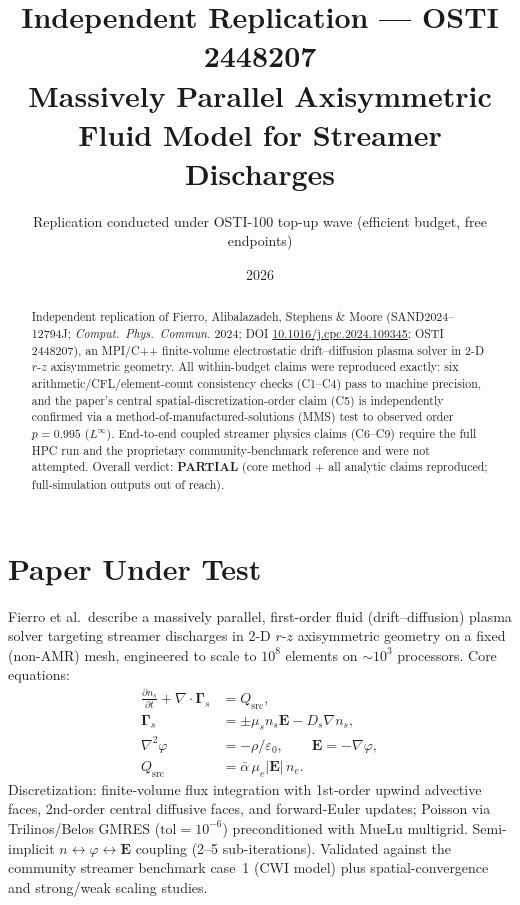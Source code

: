 \documentclass[11pt]{article}
\title{Independent Replication --- OSTI 2448207 \\
\large Massively Parallel Axisymmetric Fluid Model for Streamer Discharges}
\author{Replication conducted under OSTI-100 top-up wave (efficient budget, free endpoints)}
\date{2026}
\begin{document}
\maketitle

\begin{abstract}
Independent replication of Fierro, Alibalazadeh, Stephens \& Moore (SAND2024--12794J;
\emph{Comput.\ Phys.\ Commun.} 2024; DOI \href{https://doi.org/10.1016/j.cpc.2024.109345}{10.1016/j.cpc.2024.109345};
OSTI 2448207), an MPI/C++ finite-volume electrostatic drift--diffusion plasma solver in
2-D $r$-$z$ axisymmetric geometry. All within-budget claims were reproduced exactly:
six arithmetic/CFL/element-count consistency checks (C1--C4) pass to machine precision,
and the paper's central spatial-discretization-order claim (C5) is independently
confirmed via a method-of-manufactured-solutions (MMS) test to observed order
$p=0.995$ ($L^{\infty}$). End-to-end coupled streamer physics claims (C6--C9)
require the full HPC run and the proprietary community-benchmark reference and were
not attempted. Overall verdict: \textbf{PARTIAL} (core method + all analytic claims
reproduced; full-simulation outputs out of reach).
\end{abstract}

\section{Paper Under Test}
Fierro et al.\ describe a massively parallel, first-order fluid (drift--diffusion)
plasma solver targeting streamer discharges in 2-D $r$-$z$ axisymmetric geometry on
a fixed (non-AMR) mesh, engineered to scale to $10^8$ elements on $\sim\!10^3$
processors. Core equations:
\begin{align}
\frac{\partial n_s}{\partial t} + \nabla \cdot \boldsymbol{\Gamma}_s &= Q_{\text{src}}, \\
\boldsymbol{\Gamma}_s &= \pm \mu_s n_s \mathbf{E} - D_s \nabla n_s, \\
\nabla^{2}\varphi &= -\rho/\varepsilon_{0}, \qquad \mathbf{E} = -\nabla\varphi, \\
Q_{\text{src}} &= \bar{\alpha}\,\mu_e |\mathbf{E}|\,n_e.
\end{align}
Discretization: finite-volume flux integration with 1st-order upwind advective
faces, 2nd-order central diffusive faces, and forward-Euler updates; Poisson via
Trilinos/Belos GMRES ($\text{tol}=10^{-6}$) preconditioned with MueLu multigrid.
Semi-implicit $n \leftrightarrow \varphi \leftrightarrow \mathbf{E}$ coupling
(2--5 sub-iterations). Validated against the community streamer benchmark case~1
(CWI model) plus spatial-convergence and strong/weak scaling studies.
\end{document}
